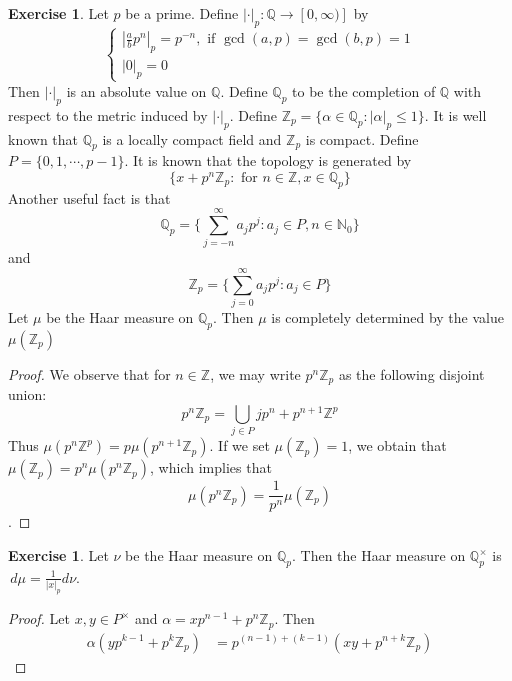 \documentclass[12pt]{amsart}
\theoremstyle{definition}
\newtheorem{ex}[definition]{Exercise}
\newcommand{\al}{\alpha}
\newcommand{\N}{\mathbb{N}}
\newcommand{\Z}{\mathbb{Z}}
\newcommand{\Q}{\mathbb{Q}}
\newcommand{\dmu}{\, d \mu}
\newcommand{\lex}[1]{\label{ex:#1}}
\begin{document}
	\begin{ex} \lex{00000} 
		Let $p$ be a prime. Define $|\cdot |_p: \Q \rightarrow [0, \infty)]$ by 
		\[
		\begin{cases}
			|\frac{a}{b}p^n|_p = p^{-n}, \text{ if } \gcd(a,p) = \gcd(b,p) = 1 \\
			|0|_p = 0
		\end{cases}
		\]
		Then $|\cdot|_p$ is an absolute value on $\Q$. Define $\Q_p$ to be the completion of $\Q$ with respect to the metric induced by $|\cdot|_p$. Define $\Z_p = \{\al \in \Q_p: |\al|_p \leq 1 \}$. It is well known that $\Q_p$ is a locally compact field and $\Z_p$ is compact. Define $P = \{0, 1, \cdots, p-1\}$. It is known that the topology is generated by  $$\{x + p^n\Z_p: \text{ for } n \in \Z, x \in \Q_p\}$$ Another useful fact is that $$\Q_p = \{\sum_{j = -n}^{\infty} a_jp^j : a_j \in P, n \in \N_0\}$$ and $$\Z_p = \{\sum_{j = 0}^{\infty} a_jp^j : a_j \in P\}$$ 
		Let $\mu$ be the Haar measure on $\Q_p$. Then $\mu$ is completely determined by the value $\mu(\Z_p)$  
	\end{ex}

	\begin{proof}
		We observe that for $n \in \Z$, we may write $p^n \Z_p$ as the following disjoint union: $$p^n\Z_p = \bigcup\limits_{j \in P} jp^n + p^{n+1}\Z^p$$ Thus $\mu(p^n \Z^{p}) = p \mu(p^{n+1}\Z_p)$. If we set $\mu(\Z_p) = 1$, we obtain that $\mu(\Z_p) = p^n \mu(p^n\Z_p)$, which implies that $$\mu(p^n \Z_p) = \frac{1}{p^n}\mu(\Z_p)$$.  
	\end{proof}
	
	\begin{ex} \lex{00000} 
		Let $\nu$ be the Haar measure on $\Q_p$. Then the Haar measure on $\Q_p^{\times}$  is $\dmu = \frac{1}{|x|_p}d \nu$.
	\end{ex}

	\begin{proof}
		Let $x, y \in P^{\times}$ and $\al = xp^{n-1} + p^n\Z_p$. Then 
		\begin{align*}
			\al (yp^{k-1} + p^k \Z_p) 
			& = p^{(n-1)+ (k-1)}(xy + p^{n+k} \Z_p) 
		\end{align*}
	\end{proof}
	
	
	
	
	
	
	
	
	
	
	
	
	
	
	
\end{document}
